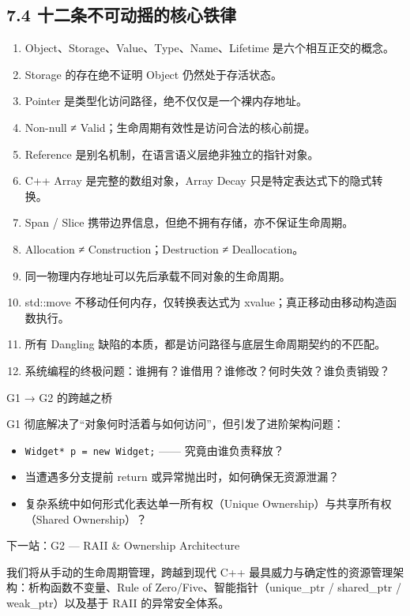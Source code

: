 \documentclass[11pt,a4paper]{article}
\begin{document}
\subsection{7.4 十二条不可动摇的核心铁律}
\begin{enumerate}
  \item Object、Storage、Value、Type、Name、Lifetime 是六个相互正交的概念。
  \item Storage 的存在绝不证明 Object 仍然处于存活状态。
  \item Pointer 是类型化访问路径，绝不仅仅是一个裸内存地址。
  \item Non-null ≠ Valid；生命周期有效性是访问合法的核心前提。
  \item Reference 是别名机制，在语言语义层绝非独立的指针对象。
  \item C++ Array 是完整的数组对象，Array Decay 只是特定表达式下的隐式转换。
  \item Span / Slice 携带边界信息，但绝不拥有存储，亦不保证生命周期。
  \item Allocation ≠ Construction；Destruction ≠ Deallocation。
  \item 同一物理内存地址可以先后承载不同对象的生命周期。
  \item std::move 不移动任何内存，仅转换表达式为 xvalue；真正移动由移动构造函数执行。
  \item 所有 Dangling 缺陷的本质，都是访问路径与底层生命周期契约的不匹配。
  \item 系统编程的终极问题：谁拥有？谁借用？谁修改？何时失效？谁负责销毁？
\end{enumerate}
G1 → G2 的跨越之桥

G1 彻底解决了“对象何时活着与如何访问”，但引发了进阶架构问题：

\begin{itemize}
  \item \texttt{Widget* p = new Widget;} —— 究竟由谁负责释放？
  \item 当遭遇多分支提前 return 或异常抛出时，如何确保无资源泄漏？
  \item 复杂系统中如何形式化表达单一所有权（Unique Ownership）与共享所有权（Shared Ownership）？
\end{itemize}
下一站：G2 — RAII \& Ownership Architecture

我们将从手动的生命周期管理，跨越到现代 C++ 最具威力与确定性的资源管理架构：析构函数不变量、Rule of Zero/Five、智能指针（unique\_ptr / shared\_ptr / weak\_ptr）以及基于 RAII 的异常安全体系。
\end{document}
